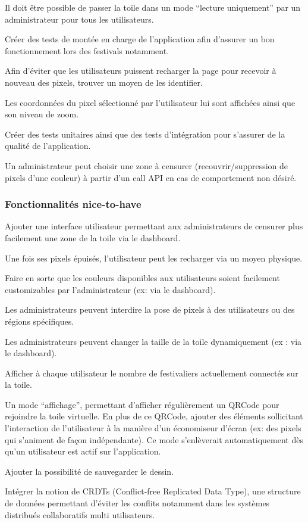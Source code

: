 \begin{todolist}
  \item[\done] Il doit être possible de passer la toile dans un mode “lecture uniquement” par un administrateur pour tous les utilisateurs.
  \item[\done] Créer des tests de montée en charge de l'application afin d'assurer un bon fonctionnement lors des festivals notamment.
  \item[\done] Afin d'éviter que les utilisateurs puissent recharger la page pour recevoir à nouveau des pixels, trouver un moyen de les identifier.
  \item[\done] Les coordonnées du pixel sélectionné par l'utilisateur lui sont affichées ainsi que son niveau de zoom.
  \item Créer des tests unitaires ainsi que des tests d'intégration pour s'assurer de la qualité de l'application.
  \item[\done] Un administrateur peut choisir une zone à censurer (recouvrir/suppression de pixels d'une couleur) à partir d'un call API en cas de comportement non désiré.
\end{todolist}

\subsubsection{Fonctionnalités \guillemotleft nice-to-have\guillemotright}

\begin{todolist}
  \item Ajouter une interface utilisateur permettant aux administrateurs de censurer plus facilement une zone de la toile via le dashboard.
  \item Une fois ses pixels épuisés, l'utilisateur peut les recharger via un moyen physique.
  \item[\done] Faire en sorte que les couleurs disponibles aux utilisateurs soient facilement customizables par l'administrateur (ex: via le dashboard).
  \item Les administrateurs peuvent interdire la pose de pixels à des utilisateurs ou des régions spécifiques.
  \item[\done] Les administrateurs peuvent changer la taille de la toile dynamiquement (ex : via le dashboard).
  \item[\done] Afficher à chaque utilisateur le nombre de festivaliers actuellement connectés sur la toile.
  \item[\done] Un mode “affichage”, permettant d'afficher régulièrement un QRCode pour rejoindre la toile virtuelle. En plus de ce QRCode, ajouter des éléments sollicitant l'interaction de l'utilisateur à la manière d'un économiseur d'écran (ex: des pixels qui s'animent de façon indépendante). Ce mode s'enlèverait automatiquement dès qu'un utilisateur est actif sur l'application.
  \item[\done] Ajouter la possibilité de sauvegarder le dessin.
  \item Intégrer la notion de CRDTs (Conflict-free Replicated Data Type), une structure de données permettant d'éviter les conflits notamment dans les systèmes distribués collaboratifs multi utilisateurs.
\end{todolist}

